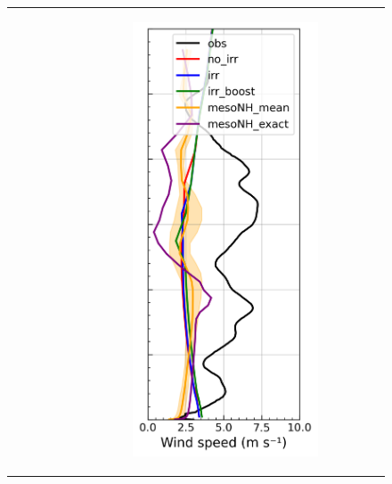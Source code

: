 \begin{figure}[hbtp]
{\begin{tabular}{@{}cccc@{}}
\begin{subfigure}[t]{0.289\textwidth}
        \end{subfigure} &
        \begin{subfigure}[t]{0.283\textwidth}
            \caption{}
            \includegraphics[width=\textwidth]{images/chap5/profiles/profile_cendrosa_wind_speed_1507_.png}

\end{subfigure}
\end{tabular}}
\end{figure}
